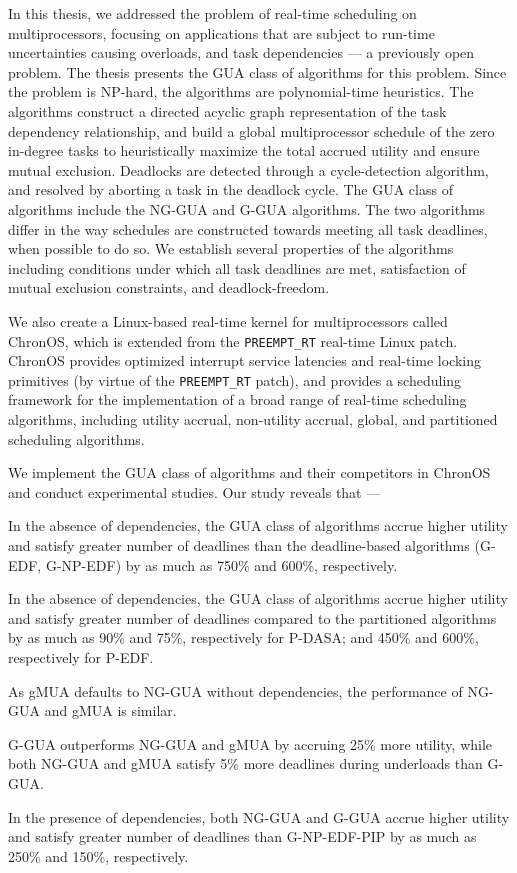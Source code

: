 \documentclass[12pt,dvips]{report}
\begin{document}
In this thesis, we addressed the problem of real-time scheduling on multiprocessors, focusing on applications that are subject to run-time uncertainties causing overloads, and task dependencies --- a previously open problem. The thesis presents the GUA class of algorithms for this problem. Since the problem is NP-hard, the algorithms are polynomial-time heuristics. The algorithms construct a directed acyclic graph representation of the task dependency relationship, and build a global multiprocessor schedule of the zero in-degree tasks to heuristically maximize the total accrued utility and ensure mutual exclusion. Deadlocks are detected through a cycle-detection algorithm, and resolved by aborting a task in the deadlock cycle. The GUA class of algorithms include the NG-GUA and G-GUA algorithms. The two algorithms differ in the way schedules are constructed towards meeting all task deadlines, when possible to do so. We establish several properties of the algorithms including conditions under which all task deadlines are met, satisfaction of mutual exclusion constraints, and deadlock-freedom. 

We also create a Linux-based real-time kernel for multiprocessors called ChronOS, which is extended from the \texttt{PREEMPT\_RT} real-time Linux patch. ChronOS provides optimized interrupt service latencies and real-time locking primitives (by virtue of the \texttt{PREEMPT\_RT} patch), and provides a scheduling framework for the implementation of a broad range of real-time scheduling algorithms, including utility accrual, non-utility accrual, global, and partitioned scheduling algorithms. 

We implement the GUA class of algorithms and their competitors in ChronOS and conduct experimental studies. Our study reveals that ---
\begin{asparaenum}[(1)]
	\item In the absence of dependencies, the GUA class of algorithms accrue higher 
	utility and satisfy greater number of deadlines than the deadline-based algorithms 
	(G-EDF, G-NP-EDF) by as much as 750\% and 600\%, respectively.
	\item In the absence of dependencies, the GUA class of algorithms accrue higher
	utility and satisfy greater number of deadlines compared to the partitioned algorithms
	by as much as 90\% and 75\%, respectively for P-DASA; and 450\% and 600\%,
	respectively for P-EDF.
	\item As gMUA defaults to NG-GUA without dependencies, the performance of NG-GUA
	and gMUA is similar.
	\item G-GUA outperforms NG-GUA and gMUA by accruing 25\% more utility, 
	while both NG-GUA and gMUA satisfy 5\% more deadlines during underloads than G-GUA.
	\item In the presence of dependencies, both NG-GUA and G-GUA accrue higher utility and
	satisfy greater number of deadlines than G-NP-EDF-PIP by as much as 250\% and 150\%, respectively.

\end{asparaenum}
\end{document}
